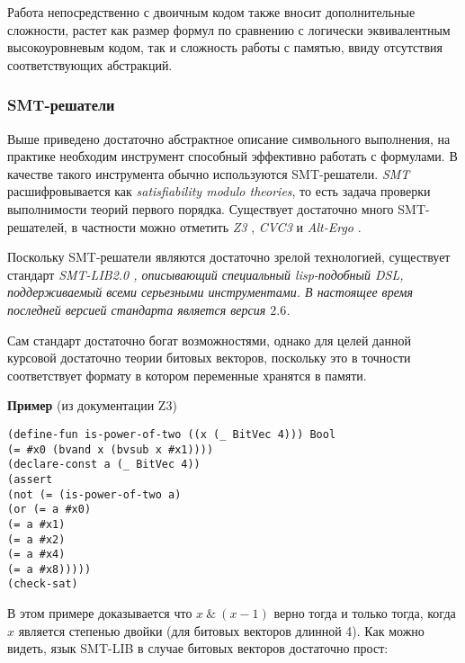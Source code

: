 Работа непосредственно с двоичным кодом также вносит дополнительные сложности, растет как размер формул по сравнению с логически эквивалентным высокоуровневым кодом, так и сложность работы с памятью, ввиду отсутствия соответствующих абстракций.

\bigskip

\subsubsection{SMT-решатели}

Выше приведено достаточно абстрактное описание символьного выполнения, на практике необходим инструмент способный эффективно работать с формулами. В качестве такого инструмента обычно используются SMT-решатели.
{\em SMT} расшифровывается как {\em satisfiability modulo theories}, то есть задача проверки выполнимости теорий первого порядка. Существует достаточно много SMT-решателей,
в частности можно отметить {\em Z3} \cite{Z3}, {\em CVC3} \cite{CVC3} и {\em Alt-Ergo} \cite{Alt-Ergo}.

\bigskip

Поскольку SMT-решатели являются достаточно зрелой технологией, существует стандарт \em {SMT-LIB2.0} \cite{smtlib}, описывающий специальный lisp-подобный DSL, поддерживаемый всеми серьезными инструментами. В настоящее время последней версией стандарта является версия $2.6$.

Сам стандарт достаточно богат возможностями, однако для целей данной курсовой достаточно теории
битовых векторов, поскольку это в точности соответствует формату в котором переменные хранятся в памяти.

{\bf Пример} (из документации Z3)
\begin{lstlisting}
(define-fun is-power-of-two ((x (_ BitVec 4))) Bool
(= #x0 (bvand x (bvsub x #x1))))
(declare-const a (_ BitVec 4))
(assert
(not (= (is-power-of-two a)
(or (= a #x0)
(= a #x1)
(= a #x2)
(= a #x4)
(= a #x8)))))
(check-sat)
\end{lstlisting}

В этом примере доказывается что $x \:\&\: (x - 1)$ верно тогда и только тогда, когда $x$ является степенью двойки (для битовых векторов длинной 4). Как можно видеть, язык SMT-LIB в случае битовых векторов достаточно прост:

